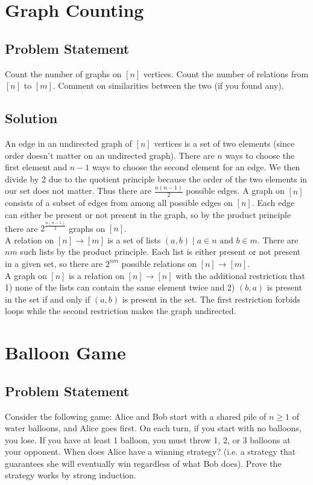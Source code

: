 \documentclass[12pt]{article}
\begin{document}
\section{Graph Counting}
\subsection*{Problem Statement}
Count the number of graphs on $[n]$ vertices. Count the number of relations from $[n]$ to $[m]$. Comment on similarities between the two (if you found any).

\subsection*{Solution}

An edge in an undirected graph of $[n]$ vertices is a set of two elements (since order doesn't matter on an undirected graph). There are $n$ ways to choose the first element and $n-1$ ways to choose the second element for an edge. We then divide by 2 due to the quotient principle because the order of the two elements in our set does not matter. Thus there are $\frac{n (n-1)}{2}$ possible edges. A graph on $[n]$ consists of a subset of edges from among all possible edges on $[n]$. Each edge can either be present or not present in the graph, so by the product principle there are $2^{\frac{n (n-1)}{2}}$ graphs on $[n]$.\\

A relation on $[n] \rightarrow [m]$ is a set of lists $(a,b) \mid a \in n \text{ and } b \in m$. There are $nm$ such lists by the product principle. Each list is either present or not present in a given set, so there are $2^{nm}$ possible relations on $[n] \rightarrow [m]$.\\

A graph on $[n]$ is a relation on $[n] \rightarrow [n]$ with the additional restriction that 1) none of the lists can contain the same element twice and 2) $(b, a)$ is present in the set if and only if $(a, b)$ is present in the set. The first restriction forbids loops while the second restriction makes the graph undirected.

\section{Balloon Game}
\subsection*{Problem Statement}
Consider the following game: Alice and Bob start with a shared pile of $n \geq 1$ of water balloons, and Alice goes first. On each turn, if you start with no balloons, you lose. If you have at least 1 balloon, you must throw 1, 2, or 3 balloons at your opponent. When does Alice have a winning strategy? (i.e. a strategy that guarantees she will eventually win regardless of what Bob does). Prove the strategy works by strong induction.
\end{document}
